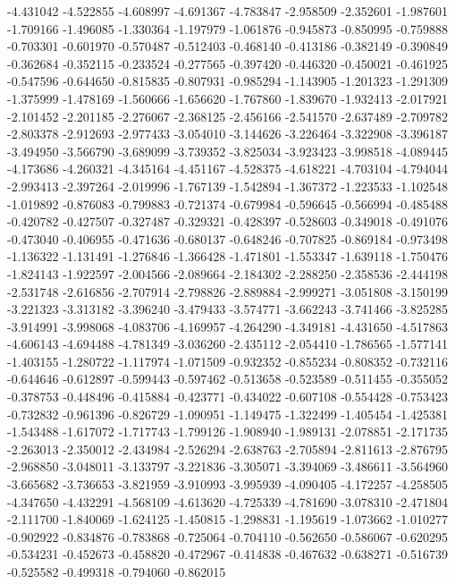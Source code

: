-4.431042
-4.522855
-4.608997
-4.691367
-4.783847
-2.958509
-2.352601
-1.987601
-1.709166
-1.496085
-1.330364
-1.197979
-1.061876
-0.945873
-0.850995
-0.759888
-0.703301
-0.601970
-0.570487
-0.512403
-0.468140
-0.413186
-0.382149
-0.390849
-0.362684
-0.352115
-0.233524
-0.277565
-0.397420
-0.446320
-0.450021
-0.461925
-0.547596
-0.644650
-0.815835
-0.807931
-0.985294
-1.143905
-1.201323
-1.291309
-1.375999
-1.478169
-1.560666
-1.656620
-1.767860
-1.839670
-1.932413
-2.017921
-2.101452
-2.201185
-2.276067
-2.368125
-2.456166
-2.541570
-2.637489
-2.709782
-2.803378
-2.912693
-2.977433
-3.054010
-3.144626
-3.226464
-3.322908
-3.396187
-3.494950
-3.566790
-3.689099
-3.739352
-3.825034
-3.923423
-3.998518
-4.089445
-4.173686
-4.260321
-4.345164
-4.451167
-4.528375
-4.618221
-4.703104
-4.794044
-2.993413
-2.397264
-2.019996
-1.767139
-1.542894
-1.367372
-1.223533
-1.102548
-1.019892
-0.876083
-0.799883
-0.721374
-0.679984
-0.596645
-0.566994
-0.485488
-0.420782
-0.427507
-0.327487
-0.329321
-0.428397
-0.528603
-0.349018
-0.491076
-0.473040
-0.406955
-0.471636
-0.680137
-0.648246
-0.707825
-0.869184
-0.973498
-1.136322
-1.131491
-1.276846
-1.366428
-1.471801
-1.553347
-1.639118
-1.750476
-1.824143
-1.922597
-2.004566
-2.089664
-2.184302
-2.288250
-2.358536
-2.444198
-2.531748
-2.616856
-2.707914
-2.798826
-2.889884
-2.999271
-3.051808
-3.150199
-3.221323
-3.313182
-3.396240
-3.479433
-3.574771
-3.662243
-3.741466
-3.825285
-3.914991
-3.998068
-4.083706
-4.169957
-4.264290
-4.349181
-4.431650
-4.517863
-4.606143
-4.694488
-4.781349
-3.036260
-2.435112
-2.054410
-1.786565
-1.577141
-1.403155
-1.280722
-1.117974
-1.071509
-0.932352
-0.855234
-0.808352
-0.732116
-0.644646
-0.612897
-0.599443
-0.597462
-0.513658
-0.523589
-0.511455
-0.355052
-0.378753
-0.448496
-0.415884
-0.423771
-0.434022
-0.607108
-0.554428
-0.753423
-0.732832
-0.961396
-0.826729
-1.090951
-1.149475
-1.322499
-1.405454
-1.425381
-1.543488
-1.617072
-1.717743
-1.799126
-1.908940
-1.989131
-2.078851
-2.171735
-2.263013
-2.350012
-2.434984
-2.526294
-2.638763
-2.705894
-2.811613
-2.876795
-2.968850
-3.048011
-3.133797
-3.221836
-3.305071
-3.394069
-3.486611
-3.564960
-3.665682
-3.736653
-3.821959
-3.910993
-3.995939
-4.090405
-4.172257
-4.258505
-4.347650
-4.432291
-4.568109
-4.613620
-4.725339
-4.781690
-3.078310
-2.471804
-2.111700
-1.840069
-1.624125
-1.450815
-1.298831
-1.195619
-1.073662
-1.010277
-0.902922
-0.834876
-0.783868
-0.725064
-0.704110
-0.562650
-0.586067
-0.620295
-0.534231
-0.452673
-0.458820
-0.472967
-0.414838
-0.467632
-0.638271
-0.516739
-0.525582
-0.499318
-0.794060
-0.862015
